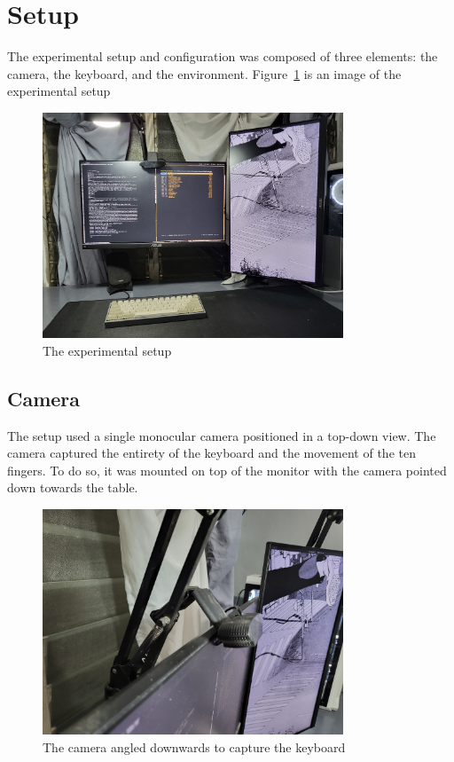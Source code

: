 \documentclass{report}
\begin{document}
\section{Setup}
\label{section:metho-setup}

The experimental setup and configuration was composed of three elements: the
camera, the keyboard, and the environment. Figure~\ref{fig:metho-setup} is an
image of the experimental setup


\begin{figure}[H]
	\centering
	\includegraphics[width=0.8\textwidth]{full-setup.jpg}
	\caption{The experimental setup}
	\label{fig:metho-setup}
	\centering
\end{figure}

\subsection{Camera}
The setup used a single monocular camera positioned in a top-down view. The
camera captured the entirety of the keyboard and the movement of the ten
fingers. To do so, it was mounted on top of the monitor with the camera pointed
down towards the table.

\begin{figure}[H]
	\centering
	\includegraphics[width=0.8\textwidth]{camera-placement.jpg}
	\caption{The camera angled downwards to capture the keyboard}
	\label{fig:metho-setup-camera-placement}
\end{figure}
\end{document}
